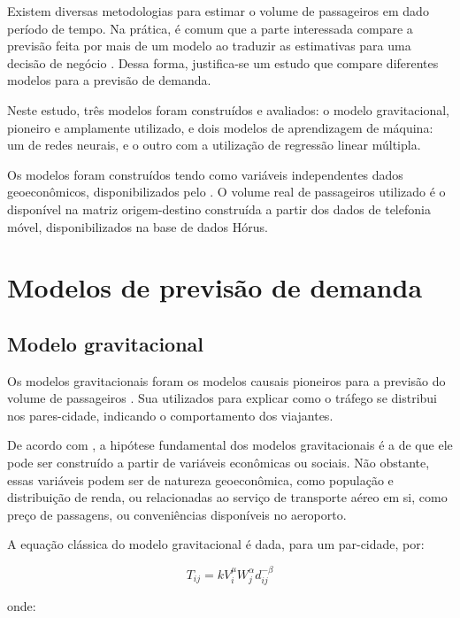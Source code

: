 \documentclass[12pt]{article}
\begin{document}
Existem diversas metodologias para estimar o volume de passageiros em
dado período de tempo. Na prática, é comum que a parte interessada
compare a previsão feita por mais de um modelo ao traduzir as
estimativas para uma decisão de negócio \citep{Grosche2007}. Dessa
forma, justifica-se um estudo que compare diferentes modelos para a
previsão de demanda.

Neste estudo, três modelos foram construídos e avaliados: o modelo
gravitacional, pioneiro e amplamente utilizado, e dois modelos de
aprendizagem de máquina: um de redes neurais, e o outro com a utilização
de regressão linear múltipla.

Os modelos foram construídos tendo como variáveis independentes dados
geoeconômicos, disponibilizados pelo \citet{atlasIpea}. O volume real de
passageiros utilizado é o disponível na matriz origem-destino construída
a partir dos dados de telefonia móvel, disponibilizados na base de dados
Hórus.

\hypertarget{modelos-de-previsuxe3o-de-demanda}{%
\section{Modelos de previsão de
demanda}\label{modelos-de-previsuxe3o-de-demanda}}

\hypertarget{modelo-gravitacional}{%
\subsection{Modelo gravitacional}\label{modelo-gravitacional}}

Os modelos gravitacionais foram os modelos causais pioneiros para a
previsão do volume de passageiros \citep{Grosche2007}. Sua utilizados
para explicar como o tráfego se distribui nos pares-cidade, indicando o
comportamento dos viajantes.

De acordo com \citet{Grosche2007}, a hipótese fundamental dos modelos
gravitacionais é a de que ele pode ser construído a partir de variáveis
econômicas ou sociais. Não obstante, essas variáveis podem ser de
natureza geoeconômica, como população e distribuição de renda, ou
relacionadas ao serviço de transporte aéreo em si, como preço de
passagens, ou conveniências disponíveis no aeroporto.

A equação clássica do modelo gravitacional é dada, para um par-cidade,
por:

\[T_{ij} = k V_i^\mu W_j^\alpha d_{ij}^{-\beta} \]

onde:
\end{document}
